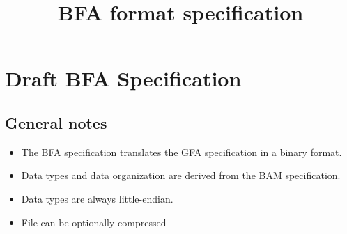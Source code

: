 \documentclass[12pt]{article}
\title{BFA format specification}
\begin{document}
\section*{Draft BFA Specification}

\subsection*{General notes}

\begin{itemize}
\item The BFA specification translates the GFA specification in a binary format.
\item Data types and data organization are derived from the BAM specification.
\item Data types are always little-endian.
\item File can be optionally compressed
\end{itemize}
\end{document}
